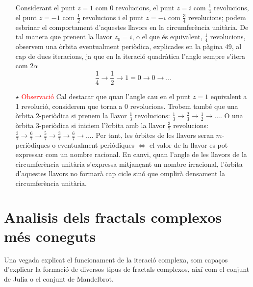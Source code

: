 \documentclass[12pt]{report}
\begin{document}
\begin{itemize}
    \newline
    \newline
   Considerant el punt $z=1$ com 0 revolucions, el punt $z=i$ com $\frac{1}{4}$ revolucions, el punt $z=-1$ com $\frac{1}{2}$ revolucions i el punt $z=-i$ com $\frac{3}{4}$ revolucions; podem esbrinar el comportament d'aquestes llavors en la circumferència unitària. De tal manera que prenent la llavor $z_0=i$, o el que és equivalent, $\frac{1}{4}$ revolucions, observem una òrbita eventualment periòdica, explicades en la pàgina 49, al cap de dues iteracions, ja que en la iteració quadràtica l'angle sempre s'itera com $2\alpha$
    $$\frac{1}{4} \rightarrow \frac{1}{2} \rightarrow 1 = 0 \rightarrow 0 \rightarrow ...$$
    \item[$\star$] \textcolor{red}{Observació}
    Cal destacar que quan l'angle cau en el punt $z=1$ equivalent a 1 revolució, considerem que torna a 0 revolucions. 
    \newline
    Trobem també que una òrbita 2-periòdica si prenem la llavor $\frac{1}{3}$ revolucions: $\frac{1}{3} \rightarrow \frac{2}{3} \rightarrow \frac{1}{2} \rightarrow ...$.
    O una òrbita 3-periòdica si  iniciem l'òrbita amb la llavor $\frac{3}{7}$ revolucions: $\frac{3}{7} \rightarrow \frac{6}{7} \rightarrow \frac{5}{7} \rightarrow \frac{3}{7} \rightarrow \frac{6}{7} \rightarrow ... $.
    \newline
    Per tant, les òrbites de les llavors seran $m$-periòdiques o eventualment periòdiques $\Leftrightarrow$ el valor de la llavor es pot expressar com un nombre racional. En canvi, quan l'angle de les llavors de la circumferència unitària s'expressa mitjançant un nombre irracional, l'òrbita d'aquestes llavors no formarà cap cicle sinó que omplirà densament la circumferència unitària.
    \end{itemize}
\section{Analisis dels fractals complexos més coneguts}
Una vegada explicat el funcionament de la iteració complexa, som capaços d'explicar la formació de diversos tipus de fractals complexos, així com el conjunt de Julia o el conjunt de Mandelbrot.
\end{document}
